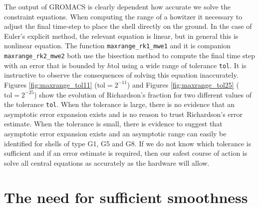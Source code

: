\documentclass[runningheads]{llncs}
\begin{document}
The output of GROMACS is clearly dependent how accurate we solve the constraint equations. When computing the range of a howitzer it necessary to adjust the final time-step to place the shell directly on the ground. In the case of Euler's explicit method, the relevant equation is linear, but in general this is nonlinear equation. The function {\tt maxrange\_rk1\_mwe1} and it is companion {\tt maxrange\_rk2\_mwe2} both use the bisection method to compute the final time step with an error that is bounded by $h \text{tol}$ using a wide range of tolerance {\tt tol}. It is instructive to observe the consequences of solving this equation inaccurately. Figures \ref{fig:maxrange_tol11} ($\text{tol} = 2^{-11}$) and Figures \ref{fig:maxrange_tol25} ($\text{tol} = 2^{-25}$) show the evolution of Richardson's fraction for two different values of the tolerance {\tt tol}. When the tolerance is large, there is no evidence that an asymptotic error expansion exists and is no reason to trust Richardson's error estimate. When the tolerance is small, there is evidence to suggest that asymptotic error expansion exists and an asymptotic range can easily be identified for shells of type G1, G5 and G8. If we do not know which tolerance is sufficient and if an error estimate is required, then our safest course of action is solve all central equations as accurately as the hardware will allow.

\section{The need for sufficient smoothness}
\end{document}
